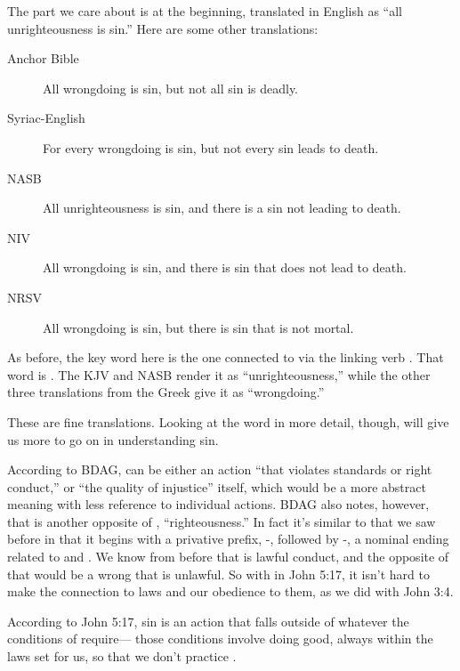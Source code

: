 				\noindent The part we care about is at the beginning,
					translated in English as ``all unrighteousness is sin.''
				Here are some other translations:
				
					\begin{description}
						\item[Anchor Bible] All wrongdoing is sin, but not all sin is deadly.
						\item[Syriac-English] For every wrongdoing is sin, but not every sin leads to death.
						\item[NASB] All unrighteousness is sin, and there is a sin not leading to death.
						\item[NIV] All wrongdoing is sin, and there is sin that does not lead to death.
						\item[NRSV] All wrongdoing is sin, but there is sin that is not mortal.
					\end{description}
					
				\noindent As before,
					the key word here is the one connected to  via the linking verb .
				That word is .
				The KJV and NASB render it as ``unrighteousness,''
					while the other three translations from the Greek give it as ``wrongdoing.''
					
				These are fine translations.
				Looking at the word in more detail,
					though,
						will give us more to go on in understanding sin.
				
				According to BDAG,
					 can be either an action ``that violates standards or right conduct,''
						or ``the quality of injustice'' itself,
							which would be a more abstract meaning with less reference to individual actions.
				BDAG also notes,
					however,
						that  is another opposite of ,
							``righteousness.''
				In fact it's similar to  that we saw before in that it begins with a privative prefix,
					-,
						followed by -,
							a nominal ending related to  and .
				We know from before that  is lawful conduct,
					and the opposite of that would be a wrong that is unlawful.
				So with  in John 5:17,
					it isn't hard to make the connection to laws and our obedience to them,
						as we did with John 3:4.
				
				According to John 5:17,
					sin is an action that falls outside of whatever the conditions of  require---%
						those conditions involve doing good,
							always within the laws set for us,
								so that we don't practice .
								

